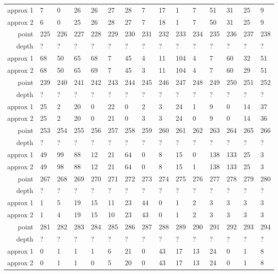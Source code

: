 \begin{center}
\begin{supertabular}{|r|l l l l l l l l l l l l l l|}
approx 1 & 7 & 0 & 26 & 26 & 27 & 28 & 7 & 17 & 1 & 7 & 51 & 31 & 25 & 9 \\
approx 2 & 6 & 0 & 25 & 26 & 28 & 27 & 7 & 18 & 1 & 7 & 50 & 31 & 25 & 9 \\
\hline
point & 225 & 226 & 227 & 228 & 229 & 230 & 231 & 232 & 233 & 234 & 235 & 236 & 237 & 238 \\
\hline
depth & ? & ? & ? & ? & ? & ? & ? & ? & ? & ? & ? & ? & ? & ? \\
approx 1 & 68 & 50 & 65 & 68 & 7 & 45 & 4 & 11 & 104 & 4 & 7 & 60 & 32 & 51 \\
approx 2 & 68 & 50 & 65 & 69 & 7 & 45 & 3 & 11 & 104 & 4 & 7 & 60 & 29 & 51 \\
\hline
point & 239 & 240 & 241 & 242 & 243 & 244 & 245 & 246 & 247 & 248 & 249 & 250 & 251 & 252 \\
\hline
depth & ? & ? & ? & ? & ? & ? & ? & ? & ? & ? & ? & ? & ? & ? \\
approx 1 & 25 & 2 & 20 & 0 & 22 & 0 & 2 & 3 & 24 & 1 & 9 & 0 & 14 & 37 \\
approx 2 & 25 & 2 & 20 & 0 & 21 & 0 & 3 & 3 & 24 & 0 & 9 & 0 & 14 & 36 \\
\hline
point & 253 & 254 & 255 & 256 & 257 & 258 & 259 & 260 & 261 & 262 & 263 & 264 & 265 & 266 \\
\hline
depth & ? & ? & ? & ? & ? & ? & ? & ? & ? & ? & ? & ? & ? & ? \\
approx 1 & 49 & 99 & 88 & 12 & 21 & 64 & 0 & 8 & 15 & 0 & 138 & 133 & 25 & 3 \\
approx 2 & 49 & 98 & 88 & 12 & 21 & 64 & 0 & 8 & 15 & 1 & 138 & 133 & 25 & 3 \\
\hline
point & 267 & 268 & 269 & 270 & 271 & 272 & 273 & 274 & 275 & 276 & 277 & 278 & 279 & 280 \\
\hline
depth & ? & ? & ? & ? & ? & ? & ? & ? & ? & ? & ? & ? & ? & ? \\
approx 1 & 1 & 5 & 19 & 15 & 11 & 23 & 44 & 0 & 1 & 2 & 3 & 3 & 3 & 3 \\
approx 2 & 1 & 4 & 19 & 15 & 10 & 23 & 43 & 0 & 1 & 2 & 3 & 3 & 3 & 3 \\
\hline
point & 281 & 282 & 283 & 284 & 285 & 286 & 287 & 288 & 289 & 290 & 291 & 292 & 293 & 294 \\
\hline
depth & ? & ? & ? & ? & ? & ? & ? & ? & ? & ? & ? & ? & ? & ? \\
approx 1 & 0 & 1 & 1 & 1 & 6 & 21 & 0 & 43 & 17 & 13 & 24 & 0 & 1 & 8 \\
approx 2 & 0 & 1 & 1 & 0 & 5 & 20 & 0 & 43 & 17 & 13 & 24 & 0 & 1 & 8 \\

\end{supertabular}
\end{center}
